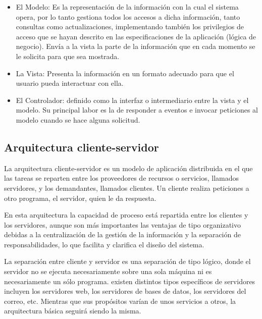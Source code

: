 \begin{itemize}

\item El Modelo: Es la representación de la información con la cual el sistema opera, por lo tanto gestiona todos los accesos a dicha información, tanto consultas como actualizaciones, implementando también los privilegios de acceso que se hayan descrito en las especificaciones de la aplicación (lógica de negocio). Envía a la vista la parte de la información que en cada momento se le solicita para que sea mostrada.

\item La Vista: Presenta la información en un formato adecuado para que el usuario pueda interactuar con ella.

\item El Controlador: definido como la interfaz o intermediario entre la vista y el modelo. Su principal labor es la de responder a eventos e invocar peticiones al modelo cuando se hace alguna solicitud. 

\end{itemize}

\subsection{Arquitectura cliente-servidor}

La arquitectura cliente-servidor es un modelo de aplicación distribuida en el que las tareas se reparten entre los proveedores de recursos o servicios, llamados servidores, y los demandantes, llamados clientes. Un cliente realiza peticiones a otro programa, el servidor, quien le da respuesta.

En esta arquitectura la capacidad de proceso está repartida entre los clientes y los servidores, aunque son más importantes las ventajas de tipo organizativo debidas a la centralización de la gestión de la información y la separación de responsabilidades, lo que facilita y clarifica el diseño del sistema.

La separación entre cliente y servidor es una separación de tipo lógico, donde el servidor no se ejecuta necesariamente sobre una sola máquina ni es necesariamente un sólo programa. existen distintos tipos específicos de servidores incluyen los servidores web, los servidores de bases de datos, los servidores del correo, etc. Mientras que sus propósitos varían de unos servicios a otros, la arquitectura básica seguirá siendo la misma.




